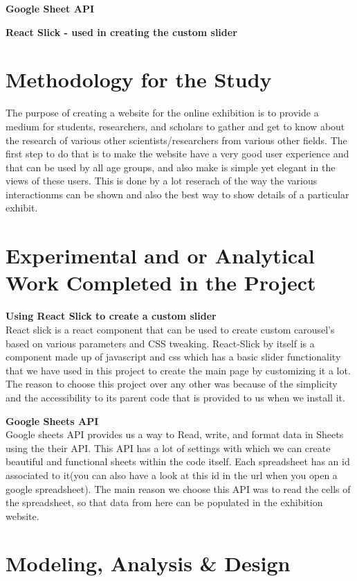 \textbf{Google Sheet API}

\textbf{React Slick - used in creating the custom slider}






\section{Methodology for the Study}

The purpose of creating a website for the online exhibition is to provide a medium for students, researchers, and scholars to gather and get to know about the research of various other scientists/researchers from various other fields. The first step to do that is to make the website have a very good user experience and that can be used by all age groups, and also make is simple yet elegant in the views of these users. This is done by a lot reserach of the way the various interactionms can be shown and also the best way to show details of a particular exhibit. 

\section{Experimental and or Analytical Work Completed in the Project}

\textbf{Using React Slick to create a custom slider}
\\
React slick is a react component that can be used to create custom carousel's based on various parameters and CSS tweaking. React-Slick by itself is a component made up of javascript and css which has a basic slider functionality that we have used in this project to create the main page by customizing it a lot. The reason to choose this project over any other was because of the simplicity and the accessibility to its parent code that is provided to us when we install it. 

\textbf{Google Sheets API}
\\
Google sheets API provides us a way to Read, write, and format data in Sheets using the their API. This API has a lot of settings with which we can create beautiful and functional sheets within the code itself. Each spreadsheet has an id associated to it(you can also have a look at this id in the url when you open a google spreadsheet).
The main reason we choose this API was to read the cells of the spreadsheet, so that data from here can be populated in the exhibition website.  

\section{Modeling, Analysis \& Design}

